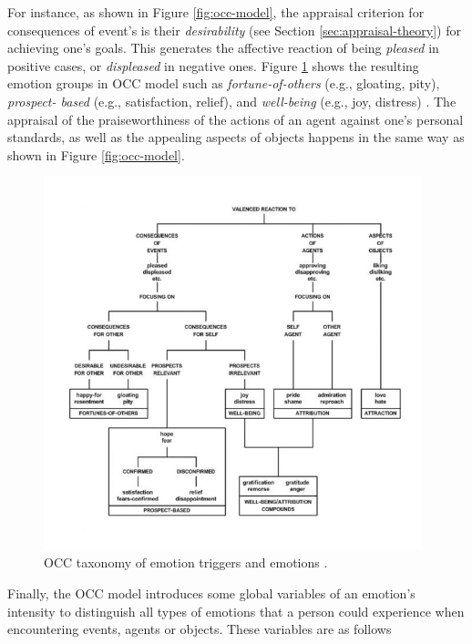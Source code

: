 \documentclass[12pt]{report}
\begin{document}
For instance, as shown in Figure \ref{fig:occ-model}, the appraisal criterion
for consequences of event’s is their \textit{desirability} (see Section
\ref{sec:appraisal-theory}) for achieving one's goals. This generates the
affective reaction of being \textit{pleased} in positive cases, or
\textit{displeased} in negative ones. Figure \ref{fig:occ-structure} shows the
resulting emotion groups in OCC model such as \textit{fortune-of-others} (e.g.,
gloating, pity), \textit{prospect- based} (e.g., satisfaction, relief), and
\textit{well-being} (e.g., joy, distress) \cite{occ:structure}. The appraisal of
the praiseworthiness of the actions of an agent against one's personal
standards, as well as the appealing aspects of objects happens in the same way
as shown in Figure \ref{fig:occ-model}.

\begin{figure}[tbh]
  \center
  \includegraphics[width=0.978\textwidth]{figure/occ-structure.jpg}
  \caption{OCC taxonomy of emotion triggers and emotions \cite{occ:structure}.}
  \label{fig:occ-structure}
\end{figure}

Finally, the OCC model introduces some global variables of an emotion's
intensity to distinguish all types of emotions that a person could experience when
encountering events, agents or objects. These variables are as follows
\end{document}

